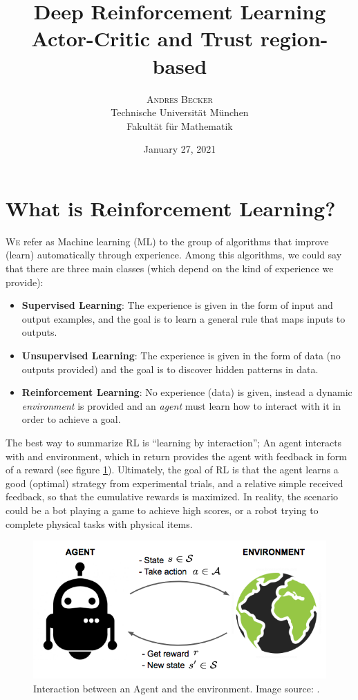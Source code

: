\documentclass[twoside,twocolumn]{article}
\title{Deep Reinforcement Learning \\ Actor-Critic and Trust region-based} %
\author{%
\textsc{Andres Becker} \\[1ex] %
\normalsize Technische Universität München \\ %
\normalsize Fakultät für Mathematik
}
\date{January 27, 2021}
\begin{document}
\maketitle


\section{What is Reinforcement Learning?}
\lettrine[nindent=0em,lines=3]{W}e refer as Machine learning (ML) to the group of algorithms that improve (learn) automatically through experience. Among this algorithms, we could say that there are three main classes (which depend on the kind of experience we provide):
\begin{itemize}
  \item \textbf{Supervised Learning}: The experience is given in the form of input and output examples, and the goal is to learn a general rule that maps inputs to outputs.
  \item \textbf{Unsupervised Learning}: The experience is given in the form of data (no outputs provided) and the goal is to discover hidden patterns in data.
  \item \textbf{Reinforcement Learning}: No experience (data) is given, instead a dynamic \emph{environment} is provided and an \emph{agent} must learn how to interact with it in order to achieve a goal.
\end{itemize}

\noindent The best way to summarize RL is ``learning by interaction''; An agent interacts with and environment, which in return provides the agent with feedback in form of a reward (see figure \ref{fig:RL_interaction}). Ultimately, the goal of RL is that the agent learns a good (optimal) strategy from experimental trials, and a relative simple received feedback, so that the cumulative rewards is maximized. In reality, the scenario could be a bot playing a game to achieve high scores, or a robot trying to complete physical tasks with physical items.

\begin{figure}
  \centering
  \includegraphics[scale=.24]{Images/RL_illustration.png}
  \caption{Interaction between an Agent and the environment. Image source: \cite{RLsummarylilian}.}
  \label{fig:RL_interaction}
\end{figure}
\end{document}
